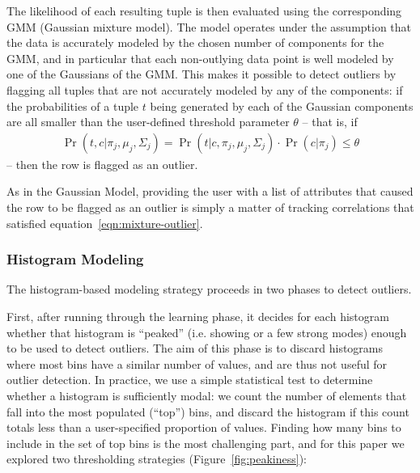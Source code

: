 The likelihood of each resulting tuple is then evaluated using the corresponding GMM (Gaussian mixture model). The model operates under the assumption that the data is accurately modeled by the chosen number of components for the GMM, and in particular that each non-outlying data point is well modeled by one of the Gaussians of the GMM. This makes it possible to detect outliers by flagging all tuples that are not accurately modeled by any of the components: if the probabilities of a tuple $t$ being generated by each of the Gaussian components are all smaller than the user-defined threshold parameter $\theta$ -- that is, if
\begin{align}
  \Pr(t, c | \pi_j, \mu_j, \Sigma_j) = \Pr(t | c, \pi_j, \mu_j, \Sigma_j) \cdot \Pr(c | \pi_j)  \leq \theta
  \label{eqn:mixture-outlier}
\end{align}
 -- then the row is flagged as an outlier.

As in the Gaussian Model, providing the user with a list of attributes that caused the row to be flagged as an outlier is simply a matter of tracking correlations that satisfied equation~\eqref{eqn:mixture-outlier}.

\subsubsection{Histogram Modeling}
The histogram-based modeling strategy proceeds in two phases to detect outliers.

First, after running through the learning phase, it decides for each histogram whether that histogram is ``peaked'' (i.e. showing or a few strong modes) enough to be used to detect outliers. The aim of this phase is to discard histograms where most bins have a similar number of values, and are thus not useful for outlier detection. In practice, we use a simple statistical test to determine whether a histogram is sufficiently modal: we count the number of elements that fall into the most populated (``top'') bins, and discard the histogram if this count totals less than a user-specified proportion of values. Finding how many bins to include in the set of top bins is the most challenging part, and for this paper we explored two thresholding strategies (Figure~\ref{fig:peakiness}):

